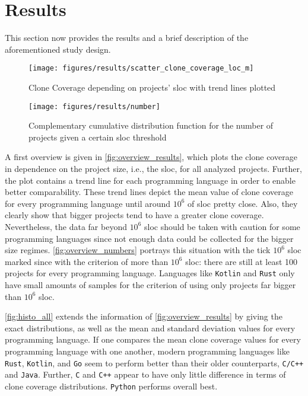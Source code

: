 
\section{Results}
\label{sec:results}

This section now provides the results and a brief description of the aforementioned study design.

\begin{figure}[tbh!]
	\centering
	\texttt{[image: figures/results/scatter\_clone\_coverage\_loc\_m]}
	\caption{Clone Coverage depending on projects' \ac{sloc} with trend lines plotted}
	\label{fig:overview_results}
\end{figure}

\begin{figure}[tbh!]
	\centering
	\texttt{[image: figures/results/number]}
	\caption{Complementary cumulative distribution function for the number of projects given a certain \ac{sloc} threshold}
	\label{fig:overview_numbers}
\end{figure}

A first overview is given in \autoref{fig:overview_results}, which plots the clone coverage in dependence on the project size, i.e., the \acl{sloc}, for all analyzed projects. Further, the plot contains a trend line for each programming language in order to enable better comparability. These trend lines depict the mean value of clone coverage for every programming language until around $10^6$ of \ac{sloc} pretty close. Also, they clearly show that bigger projects tend to have a greater clone coverage.
Nevertheless, the data far beyond $10^6$ \acl{sloc} should be taken with caution for some programming languages since not enough data could be collected for the bigger size regimes.
\autoref{fig:overview_numbers} portrays this situation with the tick $10^6$ \ac{sloc} marked since with the criterion of more than $10^6$ \ac{sloc}: there are still at least 100 projects for every programming language. 
Languages like \texttt{Kotlin} and \texttt{Rust} only have small amounts of samples for the criterion of using only projects far bigger than $10^6$ \ac{sloc}.

\autoref{fig:histo_all} extends the information of \autoref{fig:overview_results} by giving the exact distributions, as well as the mean and standard deviation values for every programming language. If one compares the mean clone coverage values for every programming language with one another, modern programming languages like \texttt{Rust}, \texttt{Kotlin}, and \texttt{Go} seem to perform better than their older counterparts, \texttt{C/C++} and \texttt{Java}. Further, \texttt{C} and \texttt{C++} appear to have only little difference in terms of clone coverage distributions. \texttt{Python} performs overall best.

